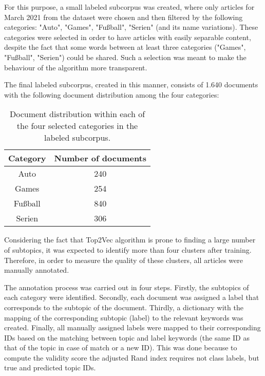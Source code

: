 \documentclass[fontsize=12pt,a4paper,twoside,openany]{scrbook}
\begin{document}
For this purpose, a small labeled subcorpus was created, where only articles for March 2021 from the dataset were chosen and then filtered by the following categories: "Auto", "Games", "Fußball", "Serien" (and its name variations). These categories were selected in order to have articles with easily separable content, despite the fact that some words between at least three categories ("Games", "Fußball", "Serien") could be shared. Such a selection was meant to make the behaviour of the algorithm more transparent.

The final labeled subcorpus, created in this manner, consists of 1.640 documents with the following document distribution among the four categories:

\begin{table}[ht]
    \centering
    \begin{tabular}{ |c|c| } 
        \hline
        \textbf{Category} & \textbf{Number of documents} \\
        \hline
        Auto & 240 \\
        \hline
        Games & 254 \\
        \hline
        Fußball & 840 \\
        \hline
        Serien & 306 \\
        \hline
    \end{tabular}
    \caption{Document distribution within each of the four selected categories in the labeled subcorpus.}
    \label{tab:doc_dist}
\end{table}

Considering the fact that Top2Vec algorithm is prone to finding a large number of subtopics, it was expected to identify more than four clusters after training. Therefore, in order to measure the quality of these clusters, all articles were manually annotated. 

The annotation process was carried out in four steps. Firstly, the subtopics of each category were identified. Secondly, each document was assigned a label that corresponds to the subtopic of the document. Thirdly, a dictionary with the mapping of the corresponding subtopic (label) to the relevant keywords was created. Finally, all manually assigned labels were mapped to their corresponding IDs based on the matching between topic and label keywords (the same ID as that of the topic in case of match or a new ID). This was done because to compute the validity score the adjusted Rand index requires not class labels, but true and predicted topic IDs.
\end{document}
